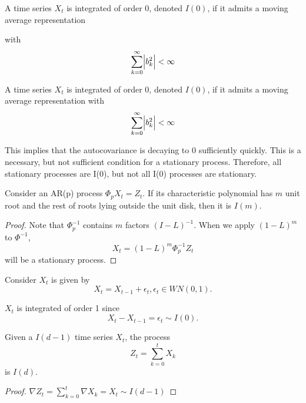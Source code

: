 \begin{definition}\cite[563]{hayashi2000econometrics}
A time series $X_t$ is integrated of order 0, denoted $I(0)$, if it admits a moving average representation 

with 
$$\sum_{k=0}^\infty \abs{b_k^2} < \infty$$
\end{definition}

\begin{definition}
A time series $X_t$ is integrated of order 0, denoted $I(0)$, if it admits a moving average representation with 
$$\sum_{k=0}^\infty \abs{b_k^2} < \infty$$
\end{definition}

\begin{remark}[interpretation]
This implies that the autocovariance is decaying to 0 sufficiently quickly. This is a necessary, but not sufficient condition for a stationary process. Therefore, all stationary processes are I(0), but not all I(0) processes are stationary.
\end{remark}

\begin{lemma}\cite[238]{lutkepohl2005new}
Consider an AR(p) process $\Phi_p X_t = Z_t$. If its characteristic polynomial has $m$ unit root and the rest of roots lying outside the unit disk, then it is $I(m)$.
\end{lemma}
\begin{proof}
Note that $\Phi_p^{-1}$ contains $m$ factors $(I-L)^{-1}$. When we apply $(1-L)^m$ to $\Phi^{-1}$, 
$$X_t = (1-L)^m \Phi_p^{-1} Z_t$$
 will be a stationary process.  
\end{proof}

\begin{example}
Consider $X_t$ is given by
$$X_t = X_{t-1} + \epsilon_t,\epsilon_t \in WN(0,1).$$

$X_t$ is integrated of order 1 since 
$$X_t - X_{t-1} = \epsilon_t \sim I(0).$$	
\end{example}



\begin{lemma}
Given a $I(d-1)$ time series $X_t$, the process
$$Z_t = \sum_{k=0}^t X_k$$
is $I(d)$.
\end{lemma}
\begin{proof}
$\nabla Z_t =  \sum_{k=0}^t \nabla X_k = X_t \sim I(d-1)$
\end{proof}




